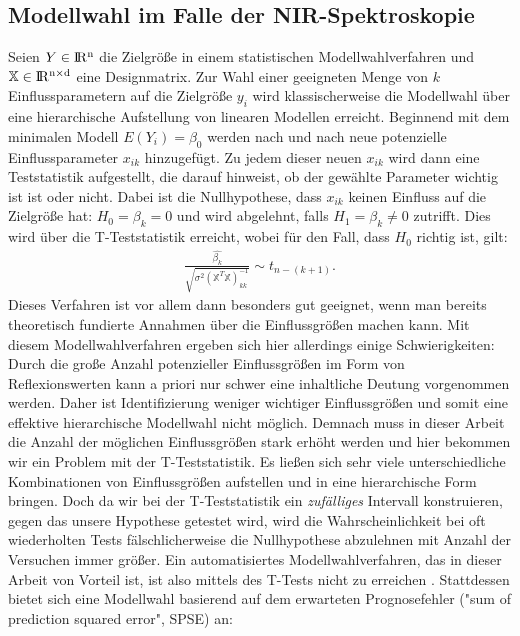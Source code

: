 	\subsection{Modellwahl im Falle der NIR-Spektroskopie}
	\label{ssec:modellwahl_nir}
	Seien $Y\in \rm I\!R^{n}$ die Zielgröße in einem statistischen Modellwahlverfahren und $\mathbb{X} \in \rm I\!R^{n \times d}$ eine Designmatrix.
	Zur Wahl einer geeigneten Menge von $k$ Einflussparametern auf die Zielgröße $y_i$  wird klassischerweise die Modellwahl über eine hierarchische Aufstellung von linearen Modellen erreicht. 
	Beginnend mit dem minimalen Modell $E(Y_i) = \beta_0$ werden nach und nach neue potenzielle Einflussparameter $x_{ik}$ hinzugefügt. 
	Zu jedem dieser neuen $x_{ik}$ wird dann eine Teststatistik aufgestellt, die darauf hinweist, ob der gewählte Parameter wichtig ist ist oder nicht. 
	Dabei ist die Nullhypothese, dass $x_{ik}$ keinen Einfluss auf die Zielgröße hat: $ H_0 = \beta_k = 0$ und wird abgelehnt, falls $H_1 = \beta_k \neq 0$ zutrifft.
	Dies wird über die T-Teststatistik erreicht,  wobei für den Fall, dass $H_0$ richtig ist, gilt:
	\begin{align*}
		\frac{\hat{\beta_k}}{\sqrt{\sigma^2(\mathbb{X}^T\mathbb{X})^{-1}_{kk}}} \sim t_{n-(k+1)}.
	\end{align*}
	Dieses Verfahren ist vor allem dann besonders gut geeignet, wenn man bereits theoretisch fundierte Annahmen über die Einflussgrößen machen kann.
	Mit diesem Modellwahlverfahren ergeben sich hier allerdings einige Schwierigkeiten:
	Durch die große Anzahl potenzieller Einflussgrößen im Form von Reflexionswerten kann a priori nur schwer eine inhaltliche Deutung vorgenommen werden.
	Daher ist Identifizierung weniger wichtiger Einflussgrößen und somit eine effektive hierarchische Modellwahl nicht möglich. 
	Demnach muss in dieser Arbeit die Anzahl der möglichen Einflussgrößen stark erhöht werden und hier bekommen wir ein Problem mit der T-Teststatistik. 
	Es ließen sich sehr viele unterschiedliche Kombinationen von Einflussgrößen aufstellen und in eine hierarchische Form bringen. 
	Doch da wir bei der T-Teststatistik ein \textit{zufälliges} Intervall konstruieren, gegen das unsere Hypothese getestet wird, wird die Wahrscheinlichkeit bei oft wiederholten Tests fälschlicherweise die Nullhypothese abzulehnen mit Anzahl der Versuchen immer größer. 
	Ein automatisiertes Modellwahlverfahren, das in dieser Arbeit von Vorteil ist, ist also mittels des T-Tests nicht zu erreichen \cite{Schumacher.2019}.
	Stattdessen bietet sich eine Modellwahl basierend auf dem erwarteten Prognosefehler ("sum of prediction squared error", SPSE) an:
